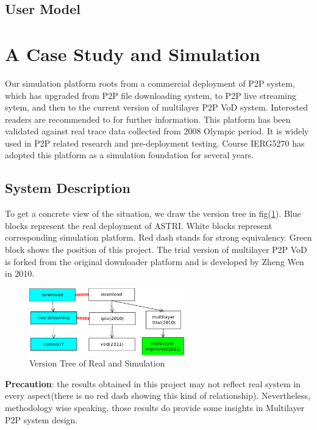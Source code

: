 \documentclass[11pt,a4paper]{article}
\begin{document}
\subsection{User Model}



\section{A Case Study and Simulation }

Our simulation platform roots from a commercial deployment
of P2P system\cite{astri}, which has upgraded from P2P file downloading 
system, to P2P live streaming sytem, and then to the current 
version of multilayer P2P VoD system. Interested
readers are recommended to \cite{huang2010simulation} for 
further information. This platform has been validated against 
real trace data collected from 2008 Olympic period. It is 
widely used in P2P related research and pre-deployment testing. 
Course IERG5270\cite{ierg5270} has adopted this platform 
as a simulation foundation for several years. 

\subsection{System Description}

To get a concrete view of the situation, we draw the 
version tree in fig(\ref{fig:simu_version_tree}). 
Blue blocks represent the real deployment of ASTRI. 
White blocks represent corresponding simulation platform.
Red dash stands for strong equivalency. 
Green block shows the position of this project. 
The trial version of multilayer P2P VoD is forked from the 
original downloader platform and is developed by 
Zheng Wen in 2010. 

\begin{figure}[htb]
	\centering
	\includegraphics[width=0.6\textwidth]{../fig/version_tree.png}
	\caption{Version Tree of Real and Simulation}
	\label{fig:simu_version_tree}
\end{figure}

\textbf{Precaution}: the results obtained in this project may not 
reflect real system in every aspect(there is no red dash showing 
this kind of relationship). Nevertheless, methodology wise speaking, 
those results do provide some insights in Multilayer P2P system design.  
\end{document}
